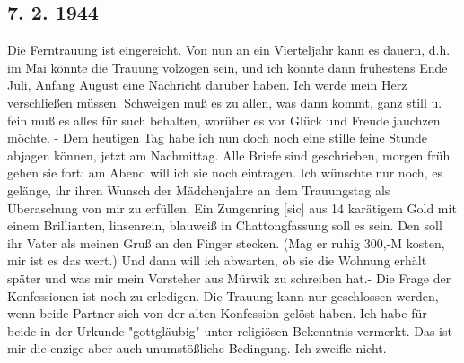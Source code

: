 \subsection{7. 2. 1944}

Die Ferntrauung ist eingereicht.
Von nun an ein Vierteljahr kann es dauern, d.h. im Mai k\"{o}nnte die Trauung volzogen sein, und ich k\"{o}nnte dann fr\"{u}hestens Ende Juli, Anfang August eine Nachricht dar\"{u}ber haben.
Ich werde mein Herz verschlie{\ss}en m\"{u}ssen.
Schweigen mu{\ss} es zu allen, was dann kommt, ganz still u. fein mu{\ss} es alles f\"{u}r such behalten, wor\"{u}ber es vor Gl\"{u}ck und Freude jauchzen m\"{o}chte.
- Dem heutigen Tag habe ich nun doch noch eine stille feine Stunde abjagen k\"{o}nnen, jetzt am Nachmittag.
Alle Briefe sind geschrieben, morgen fr\"{u}h gehen sie fort; am Abend will ich sie noch eintragen.
Ich w\"{u}nschte nur noch, es gel\"{a}nge, ihr ihren Wunsch der M\"{a}dchenjahre an dem Trauungstag als \"{U}beraschung von mir zu erf\"{u}llen.
Ein Zungenring{\color{red} [sic] } aus 14 kar\"{a}tigem Gold mit einem Brillianten, linsenrein, blauwei{\ss} in Chattongfassung soll es sein.
Den soll ihr Vater als meinen Gru{\ss} an den Finger stecken.
(Mag er ruhig 300,-M kosten, mir ist es das wert.)
Und dann will ich abwarten, ob sie die Wohnung erh\"{a}lt sp\"{a}ter und was mir mein Vorsteher aus M\"{u}rwik zu schreiben hat.-
Die Frage der Konfessionen ist noch zu erledigen.
Die Trauung kann nur geschlossen werden, wenn beide Partner sich von der alten Konfession gel\"{o}st haben.
Ich habe f\"{u}r beide in der Urkunde "gottgl\"{a}ubig" unter religi\"{o}sen Bekenntnis vermerkt.
Das ist mir die enzige aber auch unumst\"{o}{\ss}liche Bedingung.
Ich zweifle nicht.-

\clearpage
